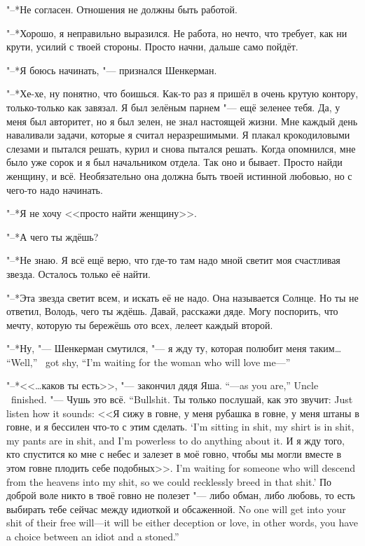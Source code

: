 "--*Не согласен.
Отношения не должны быть работой.

"--*Хорошо, я неправильно выразился.
Не работа, но нечто, что требует, как ни крути, усилий с твоей стороны.
Просто начни, дальше само пойдёт.

"--*Я боюсь начинать, "--- признался Шенкерман.

"--*Хе-хе, ну понятно, что боишься.
Как-то раз я пришёл в очень крутую контору, только-только как завязал.
Я был зелёным парнем "--- ещё зеленее тебя.
Да, у меня был авторитет, но я был зелен, не знал настоящей жизни.
Мне каждый день наваливали задачи, которые я считал неразрешимыми.
Я плакал крокодиловыми слезами и пытался решать, курил и снова пытался решать.
Когда опомнился, мне было уже сорок и я был начальником отдела.
Так оно и бывает.
Просто найди женщину, и всё.
Необязательно она должна быть твоей истинной любовью, но с чего-то надо начинать.

"--*Я не хочу <<просто найти женщину>>.

"--*А чего ты ждёшь?

"--*Не знаю.
Я всё ещё верю, что где-то там надо мной светит моя счастливая звезда.
Осталось только её найти.

"--*Эта звезда светит всем, и искать её не надо.
Она называется Солнце.
Но ты не ответил, Володь, чего ты ждёшь.
Давай, расскажи дяде.
Могу поспорить, что мечту, которую ты бережёшь ото всех, лелеет каждый второй.

{"--*Ну, "--- Шенкерман смутился, "--- я жду ту, которая полюбит меня таким\ldots{}}
{``Well,'' \Shenkerman\ got shy, ``I'm waiting for the woman who will love me---''}

{"--*<<\ldots{}каков ты есть>>, "--- закончил дядя Яша.}
{``---as you are,'' Uncle \Yasha\ finished.}
{"--- Чушь это всё.}
{``Bullshit.}
{Ты только послушай, как это звучит:}
{Just listen how it sounds:}
{<<Я сижу в говне, у меня рубашка в говне, у меня штаны в говне, и я бессилен что-то с этим сделать.}
{`I'm sitting in shit, my shirt is in shit, my pants are in shit, and I'm powerless to do anything about it.}
{И я жду того, кто спустится ко мне с небес и залезет в моё говно, чтобы мы могли вместе в этом говне плодить себе подобных>>.}
{I'm waiting for someone who will descend from the heavens into my shit, so we could recklessly breed in that shit.'}
{По доброй воле никто в твоё говно не полезет "--- либо обман, либо любовь, то есть выбирать тебе сейчас между идиоткой и обсаженной.}
{No one will get into your shit of their free will---it will be either deception or love, in other words, you have a choice between an idiot and a stoned.''}

